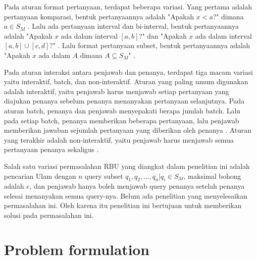 \documentclass[conference,compsoc]{IEEEtran}
\begin{document}
Pada aturan format pertanyaan, terdapat beberapa variasi. Yang pertama adalah pertanyaan komparasi, bentuk pertanyaannya adalah "Apakah $x<a$?" dimana $a \in S_M$ \cite{Innes} \cite{Auletta1992}. Lalu ada pertanyaan interval dan bi-interval, bentuk pertanyaannya adalah "Apakah $x$ ada dalam interval $[a,b]$?" \cite{Peter2017} dan "Apakah $x$ ada dalam interval $[a,b] \cup [c,d]$?" \cite{Mundici1997}. Lalu format pertanyaan subset, bentuk pertanyaannya adalah "Apakah $x$ ada dalam $A$ dimana $A \subseteq S_M$" \cite{Katona} \cite{Macula1997}.

Pada aturan interaksi antara penjawab dan penanya, terdapat tiga macam variasi yaitu interaktif, batch, dan non-interaktif. Aturan yang paling umum digunakan adalah interaktif, yaitu penjawab harus menjawab setiap pertanyaan yang diajukan penanya sebelum penanya menanyakan pertanyaan selanjutnya. Pada aturan batch, penanya dan penjawab menyepakati berapa jumlah batch. Lalu pada setiap batch, penanya memberikan beberapa pertanyaan, lalu penjawab memberikan jawaban sejumlah pertanyaan yang diberikan oleh penanya \cite{Cicalese2000}. Aturan yang terakhir adalah non-interaktif, yaitu penjawab harus menjawab semua pertanyaan penanya sekaligus \cite{Macula1997}.


Salah satu variasi permasalahan RBU yang diangkat dalam penelitian ini adalah pencarian Ulam dengan $n$ query subset ${q_1,q_2,...,q_n} | q_i \in S_M$, maksimal bohong adalah $e$, dan penjawab hanya boleh menjawab query penanya setelah penanya selesai menanyakan semua query-nya. Belum ada penelitian yang menyelesaikan permasalahan ini. Oleh karena itu penelitian ini bertujuan untuk memberikan solusi pada permasalahan ini.

\section{Problem formulation}
\end{document}
